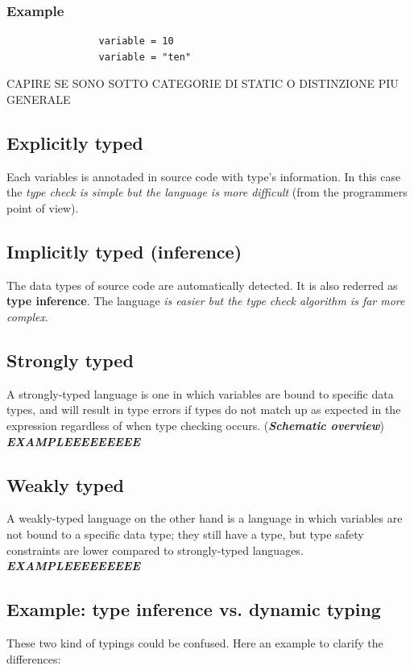 \documentclass[12pt]{article}
\begin{document}
		\subsubsection{Example}
			\begin{lstlisting}
				variable = 10
				variable = "ten"
			\end{lstlisting}
			
		CAPIRE SE SONO SOTTO CATEGORIE DI STATIC O DISTINZIONE PIU GENERALE 
	\subsection{Explicitly typed}
		Each variables is annotaded in source code with type's information. In this case the \textit{type check is simple but the language is more difficult} (from the programmers point of view).
	\subsection{Implicitly typed (inference)}
		The data types of source code are automatically detected. It is also rederred as \textbf{type inference}. The language \textit{is easier but the type check algorithm is far more complex}.
	\subsection{Strongly typed}
		A strongly-typed language is one in which variables are bound to specific data types, and will result in type errors if types do not match up as expected in the expression regardless of when type checking occurs. (\textbf{\textit{Schematic overview}})\\
		\textit{\textbf{EXAMPLEEEEEEEEE}}
	\subsection{Weakly typed} 
		A weakly-typed language on the other hand is a language in which variables are not bound to a specific data type; they still have a type, but type safety constraints are lower compared to strongly-typed languages.\\
		\textit{\textbf{EXAMPLEEEEEEEEE}}
			
			
		
	
		\subsection{Example: type inference vs. dynamic typing}
			These two kind of typings could be confused. Here an example to clarify the differences:
\end{document}
